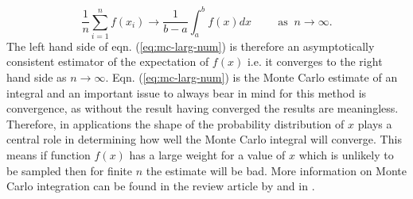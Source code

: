 \begin{equation}
  \label{eq:mc-larg-num}
  \frac{1}{n} \sum_{i=1}^n f(x_i) \rightarrow \frac{1}{b - a}\int_a^b f(x) dx \hspace{1cm}   \text{as } \: n \rightarrow \infty.
\end{equation}
The left hand side of eqn. (\ref{eq:mc-larg-num}) is therefore an asymptotically consistent estimator of the expectation of $f(x)$ i.e. it converges to the right hand side as $n \rightarrow \infty$. Eqn. (\ref{eq:mc-larg-num}) is the Monte Carlo estimate of an integral and an important issue to always bear in mind for this method is convergence, as without the result having converged the results are meaningless. Therefore, in applications the shape of the probability distribution of $x$ plays a central role in determining how well the Monte Carlo integral will converge. This means if function $f(x)$ has a large weight for a value of $x$ which is unlikely to be sampled then for finite $n$ the estimate will be bad. More information on Monte Carlo integration can be found in the review article by \cite{James:mc}  and in \citet[Chapter~5]{norris1998markov}.

